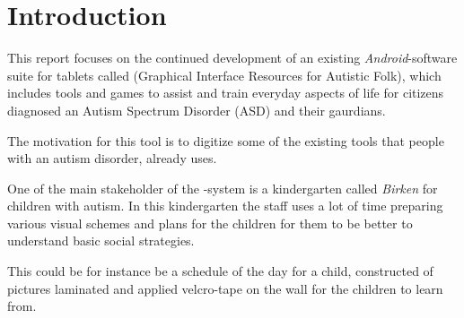\chapter{Introduction}
\label{cha:introduction}


This report focuses on the continued development of an existing \emph{Android}-software suite for tablets called \giraf(Graphical Interface Resources for Autistic Folk), which includes tools and games to assist and train everyday aspects of life for citizens diagnosed an Autism Spectrum Disorder (ASD) and their gaurdians. 

The motivation for this tool is to digitize some of the existing tools that people with an autism disorder, already uses. 

One of the main stakeholder of the \giraf-system is a kindergarten called \emph{Birken} for children with autism. In this kindergarten the staff uses a lot of time preparing various visual schemes and plans for the children for them to be better to understand basic social strategies. 

This could be for instance be a schedule of the day for a child, constructed of pictures laminated and applied velcro-tape on the wall for the children to learn from.





